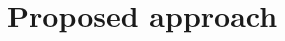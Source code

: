 \documentclass{mcp}
\begin{document}
%
%


\section{Proposed approach}
\label{sec:prop}



\end{document}
